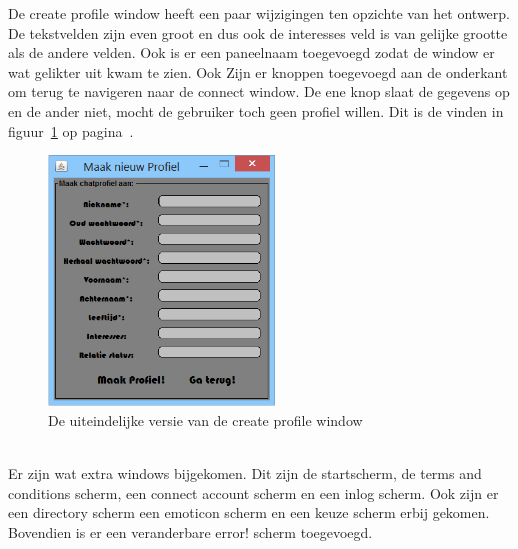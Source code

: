 \documentclass[12pt]{article}
\begin{document}
\noindent De create profile window heeft een paar wijzigingen ten opzichte van het ontwerp. De tekstvelden zijn even groot en dus ook de interesses veld is van gelijke grootte als de andere velden. Ook is er een paneelnaam toegevoegd zodat de window er wat gelikter uit kwam te zien. Ook Zijn er knoppen toegevoegd aan de onderkant om terug te navigeren naar de connect window. De ene knop slaat de gegevens op en de ander niet, mocht de gebruiker toch geen profiel willen. Dit is de vinden in figuur~\ref{figure012} op pagina~\pageref{figure012}.
\begin{figure}[ht]
\begin{center}
\includegraphics[width = 60mm]{MaakProfielGUI}
\caption{De uiteindelijke versie van de create profile window}
\label{figure012}
\end{center}
\end{figure}
\\
\newpage
\noindent Er zijn wat extra windows bijgekomen. Dit zijn de startscherm, de terms and conditions scherm,  een connect account scherm en een inlog scherm. Ook zijn er een directory scherm een emoticon scherm en een keuze scherm erbij gekomen. Bovendien is er een veranderbare error! scherm toegevoegd.
\\
\end{document}
